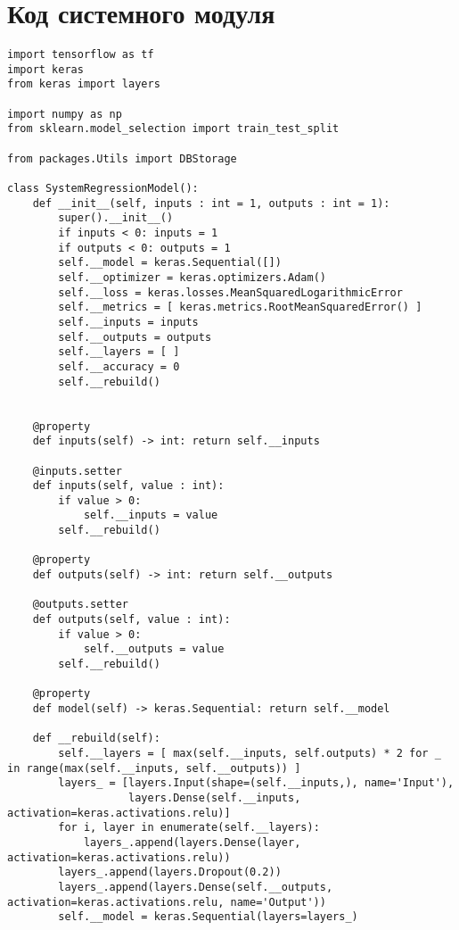 \chapter[(обязательное) Код системного модуля]{Код системного модуля} {


\begin{lstlisting}
import tensorflow as tf
import keras
from keras import layers

import numpy as np
from sklearn.model_selection import train_test_split

from packages.Utils import DBStorage

class SystemRegressionModel():
    def __init__(self, inputs : int = 1, outputs : int = 1):
        super().__init__()
        if inputs < 0: inputs = 1
        if outputs < 0: outputs = 1
        self.__model = keras.Sequential([])
        self.__optimizer = keras.optimizers.Adam()
        self.__loss = keras.losses.MeanSquaredLogarithmicError
        self.__metrics = [ keras.metrics.RootMeanSquaredError() ]
        self.__inputs = inputs
        self.__outputs = outputs
        self.__layers = [ ]
        self.__accuracy = 0
        self.__rebuild()


    @property
    def inputs(self) -> int: return self.__inputs
    
    @inputs.setter
    def inputs(self, value : int): 
        if value > 0: 
            self.__inputs = value
        self.__rebuild()
    
    @property
    def outputs(self) -> int: return self.__outputs
    
    @outputs.setter
    def outputs(self, value : int): 
        if value > 0: 
            self.__outputs = value
        self.__rebuild()
    
    @property
    def model(self) -> keras.Sequential: return self.__model
    
    def __rebuild(self):
        self.__layers = [ max(self.__inputs, self.outputs) * 2 for _ in range(max(self.__inputs, self.__outputs)) ]
        layers_ = [layers.Input(shape=(self.__inputs,), name='Input'), 
                   layers.Dense(self.__inputs, activation=keras.activations.relu)]
        for i, layer in enumerate(self.__layers):
            layers_.append(layers.Dense(layer, activation=keras.activations.relu))
        layers_.append(layers.Dropout(0.2))
        layers_.append(layers.Dense(self.__outputs, activation=keras.activations.relu, name='Output'))
        self.__model = keras.Sequential(layers=layers_)
        

\end{lstlisting}}
